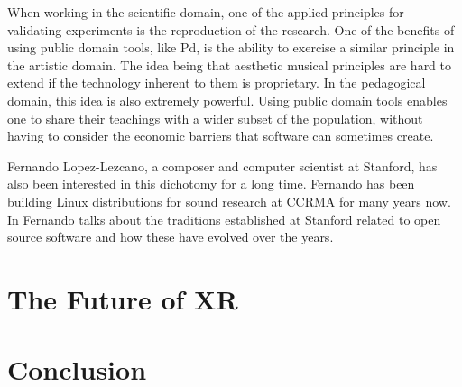 When working in the scientific domain, one of the applied principles for validating experiments is the reproduction of the research. One of the benefits of using public domain tools, like Pd, is the ability to exercise a similar principle in the artistic domain. The idea being that aesthetic musical principles are hard to extend if the technology inherent to them is proprietary. In the pedagogical domain, this idea is also extremely powerful. Using public domain tools enables one to share their teachings with a wider subset of the population, without having to consider the economic barriers that software can sometimes create. 

Fernando Lopez-Lezcano, a composer and computer scientist at Stanford, has also been interested in this dichotomy for a long time. Fernando has been building Linux distributions for sound research at CCRMA for many years now. In \cite{CEC-eCon28-online} Fernando talks about the traditions established at Stanford related to open source software and how these have evolved over the years. 


\section{The Future of XR}
\section{Conclusion}



